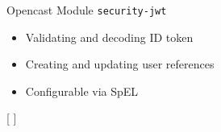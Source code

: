 \documentclass[aspectratio=169]{beamer}
\begin{document}
\begin{frame}{Opencast Module \texttt{security-jwt}}
	\begin{overprint}
		\centerline{}
		\centerline{}
	\end{overprint}
	\vspace*{-1em}
	\begin{multicols}{2}
	\begin{itemize}
		\item<3> Validating and decoding ID token
		\item<3> Creating and updating user references
	\end{itemize}
	\end{multicols}
	\vspace*{-1em}
	\begin{itemize}
		\item<3> Configurable via SpEL 
	\end{itemize}
\end{frame}

[
	\label{demo}
]
\end{document}
